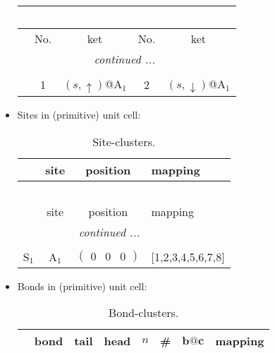 \documentclass[fleqn,10pt,landscape]{article}
\begin{document}
\begin{itemize}
\begin{center}
\begin{longtable}{c|cc|cc}
\multicolumn{4}{l}{\tablename\ \thetable{}} \\
 \hline \hline
 & No. & ket & No. & ket \\ \hline \endhead

 \hline \hline
\multicolumn{4}{r}{\footnotesize\it continued ...} \\ \endfoot

 \hline \hline
\multicolumn{4}{r}{} \\ \endlastfoot

 & 1 & $(s,\uparrow)$@A$_{1}$ & 2 & $(s,\downarrow)$@A$_{1}$ \\
\end{longtable}
\end{center}

\item Sites in (primitive) unit cell:
\begin{center}
\renewcommand{\arraystretch}{1.3}
\begin{longtable}{cc|c|l}
\caption{Site-clusters.}
 \\
 \hline \hline
 & site & position & mapping \\ \hline \endfirsthead

\multicolumn{3}{l}{\tablename\ \thetable{}} \\
 \hline \hline
 & site & position & mapping \\ \hline \endhead

 \hline \hline
\multicolumn{3}{r}{\footnotesize\it continued ...} \\ \endfoot

 \hline \hline
\multicolumn{3}{r}{} \\ \endlastfoot

S$_{1}$ & A$_1$ & $\begin{pmatrix} 0 & 0 & 0 \end{pmatrix}$ & [1,2,3,4,5,6,7,8] \\
\end{longtable}
\end{center}

\item Bonds in (primitive) unit cell:
\begin{center}
\renewcommand{\arraystretch}{1.3}
\begin{longtable}{cc|cc|c|c|c|l}
\caption{Bond-clusters.}
 \\
 \hline \hline
 & bond & tail & head & $n$ & \# & $\bm{b}@\bm{c}$ & mapping \\ \hline \endfirsthead


\end{longtable}
\end{center}
\end{itemize}
\end{document}
